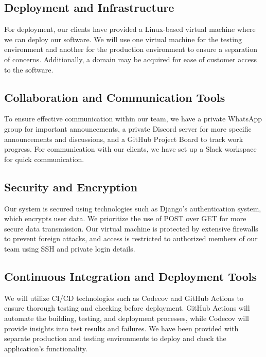 \documentclass[12pt]{article}
\begin{document}
\subsection{Deployment and Infrastructure}
For deployment, our clients have provided a Linux-based virtual machine where we can deploy our software. We will use one virtual machine for the testing environment and another for the production environment to ensure a separation of concerns. Additionally, a domain may be acquired for ease of customer access to the software.

\subsection{Collaboration and Communication Tools}
To ensure effective communication within our team, we have a private WhatsApp group for important announcements, a private Discord server for more specific announcements and discussions, and a GitHub Project Board to track work progress. For communication with our clients, we have set up a Slack workspace for quick communication.

\subsection{Security and Encryption}
Our system is secured using technologies such as Django's authentication system, which encrypts user data. We prioritize the use of POST over GET for more secure data transmission. Our virtual machine is protected by extensive firewalls to prevent foreign attacks, and access is restricted to authorized members of our team using SSH and private login details.

\subsection{Continuous Integration and Deployment Tools}
We will utilize CI/CD technologies such as Codecov and GitHub Actions to ensure thorough testing and checking before deployment. GitHub Actions will automate the building, testing, and deployment processes, while Codecov will provide insights into test results and failures. We have been provided with separate production and testing environments to deploy and check the application's functionality.

\newpage
\end{document}
